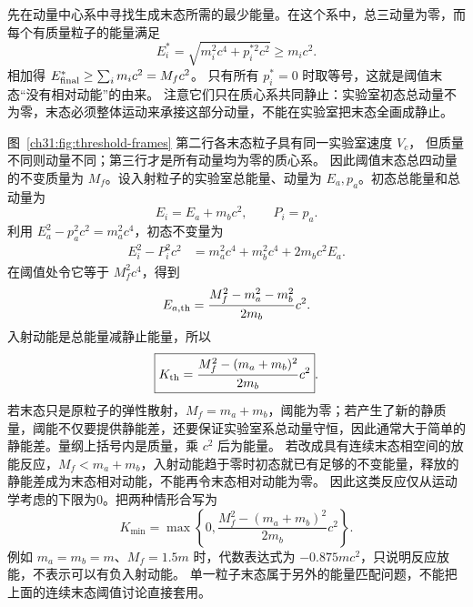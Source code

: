 \begin{xesolution}
\ModernAnswerLabel\quad 先在动量中心系中寻找生成末态所需的最少能量。在这个系中，总三动量为零，而每个有质量粒子的能量满足
\[
 E_i^*=\sqrt{m_i^2c^4+p_i^{*2}c^2}\ge m_ic^2.
\]
相加得 $E_{\rm final}^*\ge\sum_i m_ic^2=M_fc^2$。
只有所有 $p_i^*=0$ 时取等号，这就是阈值末态“没有相对动能”的由来。
注意它们只在质心系共同静止：实验室初态总动量不为零，末态必须整体运动来承接这部分动量，不能在实验室把末态全画成静止。
\begin{center}\begin{minipage}{\linewidth}\centering

\end{minipage}\end{center}
图~\ref{ch31:fig:threshold-frames} 第二行各末态粒子具有同一实验室速度 $V_c$，
但质量不同则动量不同；第三行才是所有动量均为零的质心系。
因此阈值末态总四动量的不变质量为 $M_f$。设入射粒子的实验室总能量、动量为 $E_a,p_a$。初态总能量和总动量为
\[
 E_i=E_a+m_bc^2,
 \qquad P_i=p_a.
\]
利用 $E_a^2-p_a^2c^2=m_a^2c^4$，初态不变量为
\begin{align}
 E_i^2-P_i^2c^2
 &=m_a^2c^4+m_b^2c^4+2m_bc^2E_a.
\end{align}
在阈值处令它等于 $M_f^2c^4$，得到
\[
 E_{a,\rm th}=\frac{M_f^2-m_a^2-m_b^2}{2m_b}c^2.
\]
入射动能是总能量减静止能量，所以
\begin{equation}
 \boxed{K_{\rm th}=\frac{M_f^2-(m_a+m_b)^2}{2m_b}c^2}.
\end{equation}
若末态只是原粒子的弹性散射，$M_f=m_a+m_b$，阈能为零；若产生了新的静质量，阈能不仅要提供静能差，还要保证实验室系总动量守恒，因此通常大于简单的静能差。量纲上括号内是质量，乘 $c^2$ 后为能量。
若改成具有连续末态相空间的放能反应，$M_f<m_a+m_b$，入射动能趋于零时初态就已有足够的不变能量，释放的静能差成为末态相对动能，不能再令末态相对动能为零。
因此这类反应仅从运动学考虑的下限为0。把两种情形合写为
\[
 K_{\min}=\max\left\{0,\frac{M_f^2-(m_a+m_b)^2}{2m_b}c^2\right\}.
\]
例如 $m_a=m_b=m$、$M_f=1.5m$ 时，代数表达式为 $-0.875mc^2$，只说明反应放能，不表示可以有负入射动能。
单一粒子末态属于另外的能量匹配问题，不能把上面的连续末态阈值讨论直接套用。
\end{xesolution}

